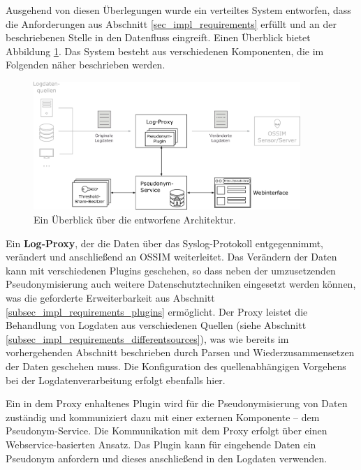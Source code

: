 Ausgehend von diesen Überlegungen wurde ein verteiltes System entworfen, dass die Anforderungen aus Abschnitt \ref{sec_impl_requirements} erfüllt und an der beschriebenen Stelle in den Datenfluss eingreift. 
Einen Überblick bietet Abbildung \ref{fig:high__level_architecture}. Das System besteht aus verschiedenen Komponenten, die im Folgenden näher beschrieben werden.

\begin{figure}[]
    \centering
        \includegraphics[width=0.9\textwidth]{dia/high_level_architecture.pdf}
    \caption{Ein Überblick über die entworfene Architektur.}
    \label{fig:high__level_architecture}
\end{figure}

Ein \textbf{Log-Proxy}, der die Daten über das Syslog-Protokoll entgegennimmt, verändert und anschließend an OSSIM weiterleitet. Das Verändern der Daten kann mit verschiedenen Plugins geschehen, so dass neben der umzusetzenden Pseudonymisierung auch weitere Datenschutztechniken eingesetzt werden können, was die geforderte Erweiterbarkeit aus Abschnitt \ref{subsec_impl_requirements_plugins} ermöglicht. Der Proxy leistet die Behandlung von Logdaten aus verschiedenen Quellen (siehe Abschnitt \ref{subsec_impl_requirements_differentsources}), was wie bereits im vorhergehenden Abschnitt beschrieben durch Parsen und Wiederzusammensetzen der Daten geschehen muss. Die Konfiguration des quellenabhängigen Vorgehens bei der Logdatenverarbeitung erfolgt ebenfalls hier.

Ein in dem Proxy enhaltenes Plugin wird für die Pseudonymisierung von Daten zuständig und kommuniziert dazu mit einer externen Komponente -- dem Pseudonym-Service. Die Kommunikation mit dem Proxy erfolgt über einen Webservice-basierten Ansatz. Das Plugin kann für eingehende Daten ein Pseudonym anfordern und dieses anschließend in den Logdaten verwenden.

